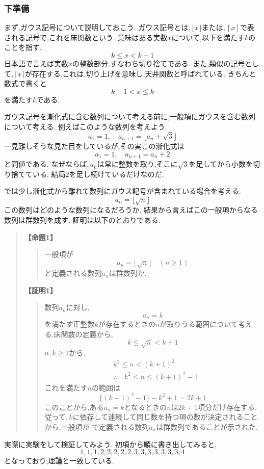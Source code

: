 \documentclass[dvipdfmx,a4paper,11pt,fleqn,openany]{jsbook}
\renewcommand{\qed}{\unskip\nobreak\quad\qedsymbol}
\begin{document}
    \subsubsection{下準備}
      まず,ガウス記号について説明しておこう.
      ガウス記号とは,\,$\lfloor x \rfloor$または,\,$[x]$で表される記号で,これを床関数という.
      意味はある実数$x$について,以下を満たす$k$のことを指す.
      \[
      k \le x < k+1
      \]
      日本語で言えば実数$x$の整数部分,すなわち切り捨てである.
      また,類似の記号として,\,$\lceil x \rceil$が存在する.これは,切り上げを意味し,天井関数と呼ばれている.
      きちんと数式で書くと
      \[
      k-1 < x \le k
      \]  
      を満たす$k$である. 
      
      ガウス記号を漸化式に含む数列について考える前に,一般項にガウスを含む数列について考える.
            例えばこのような数列を考えよう.
      \[
        a_1=1,\quad a_{n+1}=\lfloor a_n+\sqrt{3} \rfloor
      \]
      一見難しそうな見た目をしているが,その実この漸化式は
      \[
        a_1=1,\quad a_{n+1}=a_n+2
      \]
      と同値である.
      なぜならば,\,$a_n$は常に整数を取り,そこに$\sqrt{3}$を足してから小数を切り捨てている.
      結局2を足し続けているだけなのだ.
      
      では少し漸化式から離れて数列にガウス記号が含まれている場合を考える.
      \[
        a_{n}=\lfloor \sqrt{n} \rfloor
      \]
      この数列はどのような数列になるだろうか.
      結果から言えばこの一般項からなる数列は群数列を成す.
      証明は以下のとおりである.
      \begin{quote}
        \noindent \textbf{【命題1】}
        \begin{quote}
          一般項が
          \[
            a_n=\lfloor \sqrt{n} \rfloor\quad(n\ge1)
          \]
          と定義される数列$a_n$は群数列か.
        \end{quote}

        \noindent \textbf{【証明1】}
        \begin{quote}
          数列$a_n$に対し,
          \[
            a_n=k
          \]
          を満たす正整数$k$が存在するときの$n$が取りうる範囲について考える.床関数の定義から,
          \[
            k\le\sqrt{n}<k+1
          \]
          $n,k\ge1$から,
          \begin{align*}
            &k^2\le n <(k+1)^2\\
            &\therefore\quad k^2\le n \le (k+1)^2-1
          \end{align*}
          これを満たす$n$の範囲は
          \[
            \{(k+1)^2-1\}-k^2+1=2k+1
          \]
          このことから,ある$a_n=k$となるときの$n$は$2k+1$項分だけ存在する.
          従って,\,$k$に依存して連続して同じ数を持つ項の数が決定されることから,一般項が
          で定義される数列$a_n$は群数列であることが示された. \qed
        \end{quote}
      \end{quote}
      実際に実験をして検証してみよう.
      初項から順に書き出してみると,
      \[
        1,1,1,2,2,2,2,2,3,3,3,3,3,3,3,4
      \]
      となっており,理論と一致している.
\end{document}
